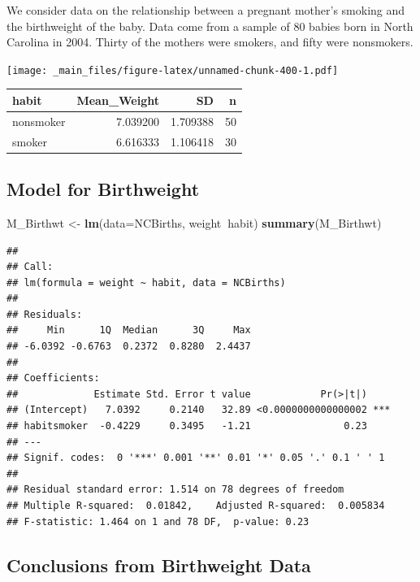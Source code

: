 \documentclass[]{book}
\newenvironment{Shaded}{\begin{snugshade}}{\end{snugshade}}
\newcommand{\KeywordTok}[1]{\textcolor[rgb]{0.13,0.29,0.53}{\textbf{#1}}}
\newcommand{\DataTypeTok}[1]{\textcolor[rgb]{0.13,0.29,0.53}{#1}}
\newcommand{\StringTok}[1]{\textcolor[rgb]{0.31,0.60,0.02}{#1}}
\newcommand{\OperatorTok}[1]{\textcolor[rgb]{0.81,0.36,0.00}{\textbf{#1}}}
\newcommand{\NormalTok}[1]{#1}
\begin{document}
We consider data on the relationship between a pregnant mother's smoking
and the birthweight of the baby. Data come from a sample of 80 babies
born in North Carolina in 2004. Thirty of the mothers were smokers, and
fifty were nonsmokers.

\texttt{[image: \_main\_files/figure-latex/unnamed-chunk-400-1.pdf]}

\begin{tabular}{l|r|r|r}
\hline
habit & Mean\_Weight & SD & n\\
\hline
nonsmoker & 7.039200 & 1.709388 & 50\\
\hline
smoker & 6.616333 & 1.106418 & 30\\
\hline
\end{tabular}

\subsection{Model for Birthweight}\label{model-for-birthweight}

\begin{Shaded}
\begin{Highlighting}[]
\NormalTok{M_Birthwt <-}\StringTok{ }\KeywordTok{lm}\NormalTok{(}\DataTypeTok{data=}\NormalTok{NCBirths, weight}\OperatorTok{~}\NormalTok{habit)}
\KeywordTok{summary}\NormalTok{(M_Birthwt)}
\end{Highlighting}
\end{Shaded}

\begin{verbatim}
## 
## Call:
## lm(formula = weight ~ habit, data = NCBirths)
## 
## Residuals:
##     Min      1Q  Median      3Q     Max 
## -6.0392 -0.6763  0.2372  0.8280  2.4437 
## 
## Coefficients:
##             Estimate Std. Error t value            Pr(>|t|)    
## (Intercept)   7.0392     0.2140   32.89 <0.0000000000000002 ***
## habitsmoker  -0.4229     0.3495   -1.21                0.23    
## ---
## Signif. codes:  0 '***' 0.001 '**' 0.01 '*' 0.05 '.' 0.1 ' ' 1
## 
## Residual standard error: 1.514 on 78 degrees of freedom
## Multiple R-squared:  0.01842,    Adjusted R-squared:  0.005834 
## F-statistic: 1.464 on 1 and 78 DF,  p-value: 0.23
\end{verbatim}

\subsection{Conclusions from Birthweight
Data}\label{conclusions-from-birthweight-data}
\end{document}
